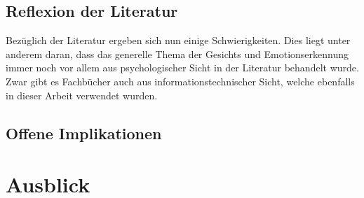 \documentclass[12pt, a4paper]{scrbook}
\begin{document}
\section{Reflexion der Literatur}
Bezüglich der Literatur ergeben sich nun einige Schwierigkeiten. Dies liegt unter anderem daran, dass das generelle Thema der Gesichts und Emotionserkennung immer noch vor allem aus
psychologischer Sicht in der Literatur behandelt wurde. Zwar gibt es Fachbücher auch aus informationstechnischer Sicht, welche ebenfalls in dieser Arbeit verwendet wurden.

\section{Offene Implikationen}

\chapter{Ausblick}
\end{document}
